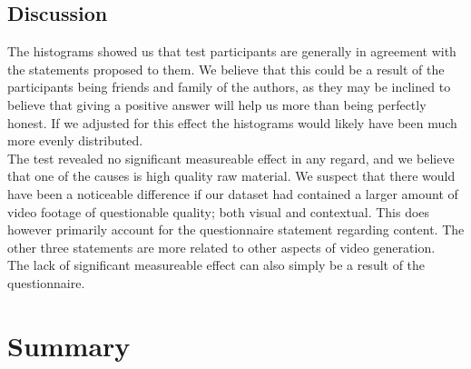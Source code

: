 \subsection{Discussion}
%
The histograms showed us that test participants are generally in agreement with the statements proposed to them. We believe that this could be a result of the participants being friends and family of the authors, as they may be inclined to believe that giving a positive answer will help us more than being perfectly honest. If we adjusted for this effect the histograms would likely have been much more evenly distributed.\\
%
The test revealed no significant measureable effect in any regard, and we believe that one of the causes is high quality raw material. We suspect that there would have been a noticeable difference if our dataset had contained a larger amount of video footage of questionable quality; both visual and contextual. This does however primarily account for the questionnaire statement regarding content. The other three statements are more related to other aspects of video generation.\\
The lack of significant measureable effect can also simply be a result of the questionnaire. 
%
\section{Summary}
%

%

%